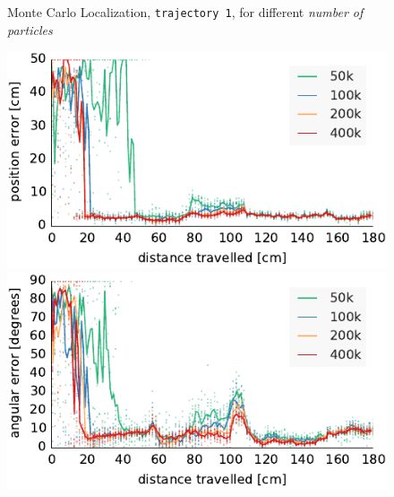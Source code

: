 \documentclass[letterpaper, 10pt, conference]{ieeeconf}
\begin{document}
\begin{figure}
\begin{center}
Monte Carlo Localization, \texttt{trajectory~1}, for different \emph{number of particles}
\end{center}
\includegraphics{mcl-whole_random_1-xy}\hfill
\includegraphics{mcl-whole_random_1-theta}

\vspace{.5em}


\end{figure}
\end{document}
